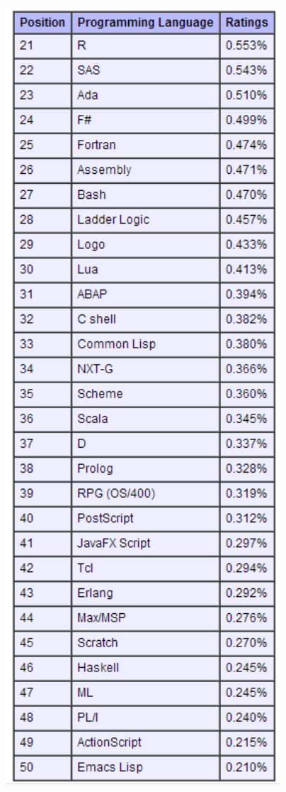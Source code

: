 \documentclass[11pt]{article} %
\begin{document}
\includegraphics[width=14cm]{imagenes/extendedRanking.png}
\end{document}
